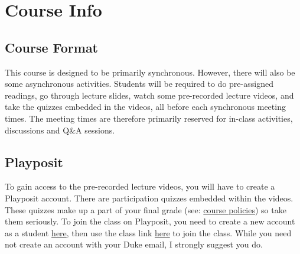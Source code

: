\documentclass[11pt, a4paper]{article}
\begin{document}
\section{Course Info}
\subsection{Course Format}
This course is designed to be primarily synchronous. However, there will also be some asynchronous activities. Students will be required to do pre-assigned readings, go through lecture slides, watch some pre-recorded lecture videos, and take the quizzes embedded in the videos, all before each synchronous meeting times. The meeting times are therefore primarily reserved for in-class activities, discussions and Q\&A sessions. %

\subsection{Playposit}
To gain access to the pre-recorded lecture videos, you will have to create a Playposit account. There are participation quizzes embedded within the videos. These quizzes make up a part of your final grade (see: \href{https://ids702-f21.olanrewajuakande.com/policies/}{course policies}) so take them seriously. To join the class on Playposit, you need to create a new account as a student \href{https://www.playposit.com/join}{here}, then use the class link \href{https://www.playposit.com/join-class/1403540-1083318}{here} to join the class. While you need not create an account with your Duke email, I strongly suggest you do.

\end{document}
